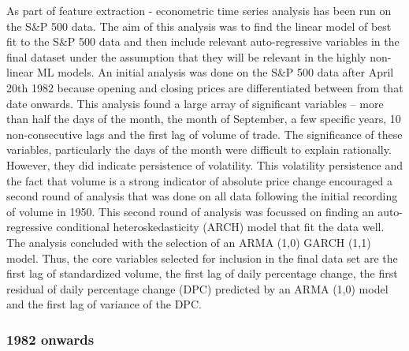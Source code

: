 \documentclass[11pt,preprint, authoryear]{elsarticle}
\numberwithin{equation}{section}
\numberwithin{figure}{section}
\numberwithin{table}{section}
\begin{document}
As part of feature extraction - econometric time series analysis has
been run on the S\&P 500 data. The aim of this analysis was to find the
linear model of best fit to the S\&P 500 data and then include relevant
auto-regressive variables in the final dataset under the assumption that
they will be relevant in the highly non-linear ML models. An initial
analysis was done on the S\&P 500 data after April 20th 1982 because
opening and closing prices are differentiated between from that date
onwards. This analysis found a large array of significant variables --
more than half the days of the month, the month of September, a few
specific years, 10 non-consecutive lags and the first lag of volume of
trade. The significance of these variables, particularly the days of the
month were difficult to explain rationally. However, they did indicate
persistence of volatility. This volatility persistence and the fact that
volume is a strong indicator of absolute price change encouraged a
second round of analysis that was done on all data following the initial
recording of volume in 1950. This second round of analysis was focussed
on finding an auto-regressive conditional heteroskedasticity (ARCH)
model that fit the data well. The analysis concluded with the selection
of an ARMA (1,0) GARCH (1,1) model. Thus, the core variables selected
for inclusion in the final data set are the first lag of standardized
volume, the first lag of daily percentage change, the first residual of
daily percentage change (DPC) predicted by an ARMA (1,0) model and the
first lag of variance of the DPC.

\hypertarget{onwards}{%
\subsubsection{1982 onwards}\label{onwards}}
\end{document}
